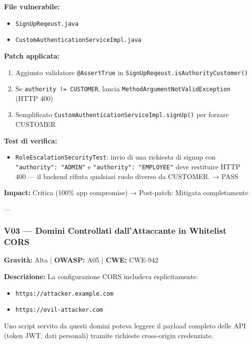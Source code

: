 \documentclass[12pt, a4paper]{article}
\begin{document}
    \textbf{File vulnerabile:}
    \begin{itemize}
        \item \texttt{SignUpReqeust.java}
        \item \texttt{CustomAuthenticationServiceImpl.java}
    \end{itemize}

    \textbf{Patch applicata:}
    \begin{enumerate}
        \item Aggiunto validatore \texttt{@AssertTrue} in \texttt{SignUpReqeust.isAuthorityCustomer()}
        \item Se \texttt{authority != CUSTOMER}, lancia \texttt{MethodArgumentNotValidException} (HTTP 400)
        \item Semplificato \texttt{CustomAuthenticationServiceImpl.signUp()} per forzare CUSTOMER
    \end{enumerate}

    \textbf{Test di verifica:}
    \begin{itemize}
        \item \texttt{RoleEscalationSecurityTest}: invio di una richiesta di signup con
        \texttt{"authority": "ADMIN"} e \texttt{"authority": "EMPLOYEE"} deve restituire
        HTTP 400 — il backend rifiuta qualsiasi ruolo diverso da CUSTOMER. → \checkmark{} PASS
    \end{itemize}

    \textbf{Impact:} Critica (100\% app compromise) → Post-patch: Mitigata completamente

    ---

    \subsubsection{V03 — Domini Controllati dall'Attaccante in Whitelist CORS}

    \textbf{Gravità:} Alta | \textbf{OWASP:} A05 | \textbf{CWE:} CWE-942

    \textbf{Descrizione:} La configurazione CORS includeva esplicitamente:
    \begin{itemize}
        \item \texttt{https://attacker.example.com}
        \item \texttt{https://evil-attacker.com}
    \end{itemize}

    Uno script servito da questi domini poteva leggere il payload completo delle API
    (token JWT, dati personali) tramite richieste cross-origin credenziate.
\end{document}
